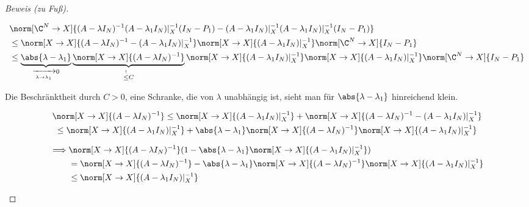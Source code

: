 \begin{proof}[Beweis (zu Fuß)]
\begin{enumerate}[label = (\roman*)]
        \begin{align*}
            &
            \norm[\C^N \to X]
            {
                (A - \lambda I_N)^{-1}
                (A - \lambda_1 I_N) |_X^{-1}
                (I_N - P_1)
                -
                (A - \lambda_1 I_N) |_X^{-1}
                (A - \lambda_1 I_N) |_X^{-1}
                (I_N - P_1)
            } \\
            & \leq
            \norm[X \to X]
            {
                (A - \lambda I_N)^{-1}
                -
                (A - \lambda_1 I_N) |_X^{-1}
            }
            \norm[X \to X]{(A - \lambda_1 I_N) |_X^{-1}}
            \norm[\C^N \to X]{I_N - P_1} \\
            & \leq
            \underbrace
            {
                \abs{\lambda - \lambda_1}
            }_{
                \xrightarrow[\lambda \to \lambda_1]{} 0
            }
            \underbrace
            {
                \norm[X \to X]{(A - \lambda I_N)^{-1}}
            }_{
                \stackrel{!}{\leq} C
            }
            \norm[X \to X]{(A - \lambda_1 I_N) |_X^{-1}}
            \norm[X \to X]{(A - \lambda_1 I_N) |_X^{-1}}
            \norm[\C^N \to X]{I_N - P_1}
        \end{align*}

        Die Beschränktheit durch $C > 0$, eine Schranke, die von $\lambda$ unabhängig ist, sieht man für $\abs{\lambda - \lambda_1}$ hinreichend klein.

        \begin{multline*}
            \norm[X \to X]{(A - \lambda I_N)^{-1}}
            \leq
            \norm[X \to X]{(A - \lambda_1 I_N) |_X^{-1}}
            +
            \norm[X \to X]
            {
                (A - \lambda I_N)^{-1}
                -
                (A - \lambda_1 I_N) |_X^{-1}
            } \\
            \leq
            \norm[X \to X]{(A - \lambda_1 I_N) |_X^{-1}}
            +
            \abs{\lambda - \lambda_1}
            \norm[X \to X]{(A - \lambda I_N)^{-1}}
            \norm[X \to X]{(A - \lambda_1 I_N) |_X^{-1}}           
        \end{multline*}

        \begin{align*}
            \implies
            &
            \norm[X \to X]{(A - \lambda I_N)^{-1}}
            (
                1
                -
                \abs{\lambda - \lambda_1}
                \norm[X \to X]{(A - \lambda_1 I_N) |_X^{-1}}
            ) \\
            & =
            \norm[X \to X]{(A - \lambda I_N)^{-1}}
            -
            \abs{\lambda - \lambda_1}
            \norm[X \to X]{(A - \lambda I_N)^{-1}}
            \norm[X \to X]{(A - \lambda_1 I_N) |_X^{-1}} \\
            & \leq
            \norm[X \to X]{(A - \lambda_1 I_N) |_X^{-1}}
        \end{align*}


\end{enumerate}
\end{proof}
